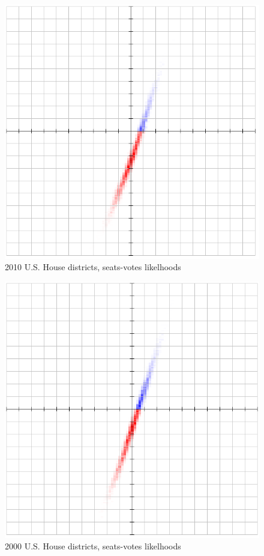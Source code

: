 \documentclass[preprint,12pt]{article}
\begin{document}
\begin{figure}[htb!]
    \begin{center}
        \includegraphics[scale=0.5]{Figures/original_method/2010_ush.png}
        \caption{2010 U.S. House districts, seats-votes likelhoods}\label{fig:2010_ush}
    \end{center}
\end{figure}
\begin{figure}[htb!]
    \begin{center}
        \includegraphics[scale=0.5]{Figures/original_method/2000_ush.png}
        \caption{2000 U.S. House districts, seats-votes likelhoods}\label{fig:2000_ush}
    \end{center}
\end{figure}
\end{document}

